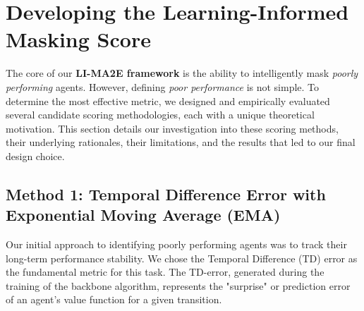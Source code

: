 \section{Developing the Learning-Informed Masking Score}
\label{sec:scoring_methods}

The core of our \textbf{LI-MA2E framework} is the ability to intelligently mask \textit{poorly performing} agents. However, defining \textit{poor performance} is not simple. To determine the most effective metric, we designed and empirically evaluated several candidate scoring methodologies, each with a unique theoretical motivation. This section details our investigation into these scoring methods, their underlying rationales, their limitations, and the results that led to our final design choice.
\subsection{Method 1: Temporal Difference Error with Exponential Moving Average (EMA)}
\label{subsec:ema_method}




Our initial approach to identifying poorly performing agents was to track their long-term performance stability. We chose the Temporal Difference (TD) error as the fundamental metric for this task. The TD-error, generated during the training of the backbone  algorithm, represents the "surprise" or prediction error of an agent's value function for a given transition. 

